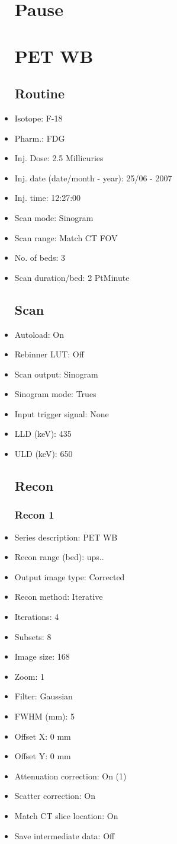 \documentclass[12pt]{article}
\begin{document}
\begin{itemize}
\section{Pause}

\section{PET WB}
\subsection{Routine}
\item Isotope: F-18
\item Pharm.: FDG
\item Inj. Dose: 2.5 Millicuries
\item Inj. date (date/month - year): 25/06 - 2007
\item Inj. time: 12:27:00
\item Scan mode: Sinogram
\item Scan range: Match CT FOV
\item No. of beds: 3
\item Scan duration/bed: 2 PtMinute
\subsection{Scan}
\item Autoload: On
\item Rebinner LUT: Off
\item Scan output: Sinogram
\item Sinogram mode: Trues
\item Input trigger signal: None
\item LLD (keV): 435
\item ULD (keV): 650
\subsection{Recon}

\subsubsection{Recon 1}
\item Series description: PET WB 
\item Recon range (bed): ups..
\item Output image type: Corrected
\item Recon method: Iterative
\item Iterations: 4
\item Subsets: 8
\item Image size: 168
\item Zoom: 1
\item Filter: Gaussian
\item FWHM (mm): 5
\item Offset X: 0 mm
\item Offset Y: 0 mm
\item Attenuation correction: On (1)
\item Scatter correction: On
\item Match CT slice location: On
\item Save intermediate data: Off

\end{itemize}
\end{document}
